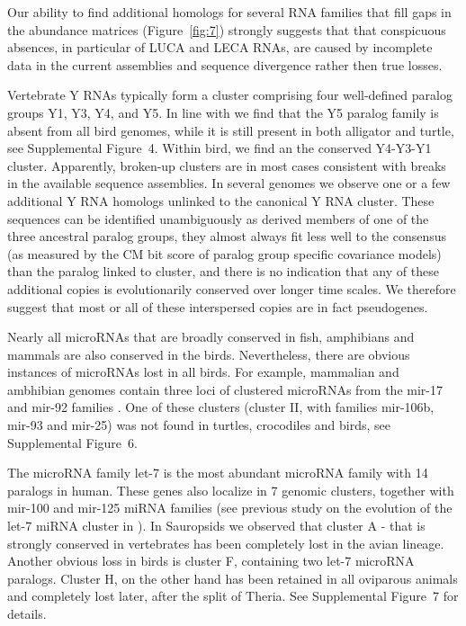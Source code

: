 \documentclass[10pt]{bmc_article}
\newenvironment{bmcformat}{\begin{raggedright}\baselineskip20pt\sloppy\setboolean{publ}{false}}{\end{raggedright}\baselineskip20pt\sloppy}
\begin{document}
\begin{bmcformat}
Our ability to find additional homologs for several RNA families that fill
gaps in the abundance matrices (Figure~\ref{fig:7})
strongly suggests that that conspicuous absences, in particular of LUCA and
LECA RNAs, are caused by incomplete data in the current assemblies and
sequence divergence rather then true losses.


Vertebrate Y RNAs typically form a cluster comprising four
well-defined paralog groups Y1, Y3, Y4, and Y5. In line with
\cite{Mosig:07a} we find that the Y5 paralog family is absent from all
bird genomes, while it is still present in both alligator and turtle,
see Supplemental Figure~4. Within bird, we find an the conserved
Y4-Y3-Y1 cluster. Apparently, broken-up clusters are in most cases
consistent with breaks in the available sequence assemblies. In
several genomes we observe one or a few additional Y RNA homologs
unlinked to the canonical Y RNA cluster. These sequences can be
identified unambiguously as derived members of one of the three
ancestral paralog groups, they almost always fit less well to the
consensus (as measured by the CM bit score of paralog group specific
covariance models) than the paralog linked to cluster, and there is no
indication that any of these additional copies is evolutionarily
conserved over longer time scales. We therefore suggest that most or
all of these interspersed copies are in fact pseudogenes.


Nearly all microRNAs that are broadly conserved in fish, amphibians and
mammals are also conserved in the birds. Nevertheless, there are obvious
instances of microRNAs lost in all birds. For example, mammalian and
ambhibian genomes contain three loci of clustered microRNAs from the mir-17
and mir-92 families \cite{Tanzer:04}. One of these clusters (cluster II,
with families mir-106b, mir-93 and mir-25) was not found in turtles,
crocodiles and birds, see Supplemental Figure~6.

The microRNA family let-7 is the most abundant microRNA family with 14
paralogs in human. These genes also localize in 7 genomic clusters,
together with mir-100 and mir-125 miRNA families (see previous study on the
evolution of the let-7 miRNA cluster in \cite{Hertel:2012}). In Sauropsids
we observed that cluster A - that is strongly conserved in vertebrates has
been completely lost in the avian lineage. Another obvious loss in birds is
cluster F, containing two let-7 microRNA paralogs. Cluster H, on the other
hand has been retained in all oviparous animals and completely lost later,
after the split of Theria. See Supplemental Figure~7 for details.




\end{bmcformat}
\end{document}
